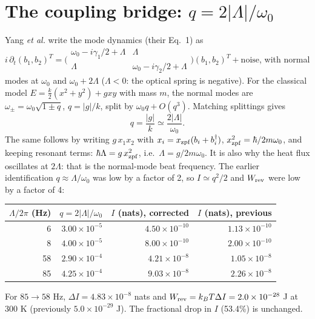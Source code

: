 \documentclass[9pt]{article}
\begin{document}
\section{\texorpdfstring{The coupling bridge: $q=2|\Lambda|/\omega_0$}{The coupling bridge}}
Yang \emph{et al.} write the mode dynamics (their Eq.~1) as
$i\,\partial_t(b_1,b_2)^T=\bigl(\begin{smallmatrix}\omega_0-i\gamma_1/2+\Lambda & \Lambda\\ \Lambda & \omega_0-i\gamma_2/2+\Lambda\end{smallmatrix}\bigr)(b_1,b_2)^T+\text{noise}$,
with normal modes at $\omega_0$ and $\omega_0+2\Lambda$ ($\Lambda<0$: the optical spring is negative).\cite{yang2020} For the classical model $E=\tfrac{k}{2}(x^2+y^2)+gxy$ with mass $m$, the normal modes are $\omega_\pm=\omega_0\sqrt{1\pm q}$, $q=|g|/k$, split by $\omega_0 q+O(q^3)$. Matching splittings gives
\begin{equation}
 q=\frac{|g|}{k}\simeq\frac{2|\Lambda|}{\omega_0}.
\end{equation}
The same follows by writing $g\,x_1x_2$ with $x_i=x_{\rm zpf}(b_i+b_i^\dagger)$, $x_{\rm zpf}^2=\hbar/2m\omega_0$, and keeping resonant terms: $\hbar\Lambda=g\,x_{\rm zpf}^2$, i.e.\ $\Lambda=g/2m\omega_0$. It is also why the heat flux oscillates at $2\Lambda$: that is the normal-mode beat frequency. The earlier identification $q\approx\Lambda/\omega_0$ was low by a factor of 2, so $I\simeq q^2/2$ and $W_{\rm rev}$ were low by a factor of 4:
\begin{center}
\begin{tabular}{rrrr}
\toprule
$\Lambda/2\pi$ (Hz) & $q=2|\Lambda|/\omega_0$ & $I$ (nats), corrected & $I$ (nats), previous\\
\midrule
6  & $3.00\times10^{-5}$ & $4.50\times10^{-10}$ & $1.13\times10^{-10}$\\
8  & $4.00\times10^{-5}$ & $8.00\times10^{-10}$ & $2.00\times10^{-10}$\\
58 & $2.90\times10^{-4}$ & $4.21\times10^{-8}$  & $1.05\times10^{-8}$\\
85 & $4.25\times10^{-4}$ & $9.03\times10^{-8}$  & $2.26\times10^{-8}$\\
\bottomrule
\end{tabular}
\end{center}
For $85\to58$ Hz, $\Delta I=4.83\times10^{-8}$ nats and $W_{\rm rev}=k_BT\Delta I=2.0\times10^{-28}$ J at 300 K (previously $5.0\times10^{-29}$ J). The fractional drop in $I$ (53.4\%) is unchanged.
\end{document}
